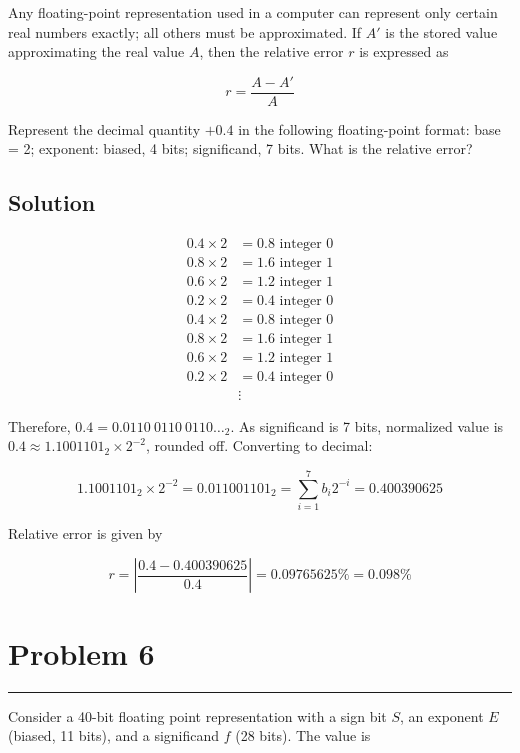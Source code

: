 \documentclass{article}
\begin{document}
Any floating-point representation used in a computer can represent only certain real numbers exactly; all others must be approximated. If $A'$ is the stored value approximating the real value $A$, then the relative error $r$ is expressed as

\[
    r = \frac{A - A'}{A}
\]

Represent the decimal quantity $+0.4$ in the following floating-point format: base = 2; exponent: biased, 4 bits; significand, 7 bits. What is the relative error?

\subsection*{Solution}

\[\begin{aligned}
        0.4 \times 2 & = 0.8 \text{ integer } 0 \\
        0.8 \times 2 & = 1.6 \text{ integer } 1 \\
        0.6 \times 2 & = 1.2 \text{ integer } 1 \\
        0.2 \times 2 & = 0.4 \text{ integer } 0 \\
        0.4 \times 2 & = 0.8 \text{ integer } 0 \\
        0.8 \times 2 & = 1.6 \text{ integer } 1 \\
        0.6 \times 2 & = 1.2 \text{ integer } 1 \\
        0.2 \times 2 & = 0.4 \text{ integer } 0 \\
                     & \vdots
    \end{aligned}\]

Therefore, $0.4 = 0.0110\ 0110\ 0110\dots_2$. As significand is 7 bits, normalized value is $0.4 \approx 1.1001101_2 \times 2^{-2}$, rounded off. Converting to decimal:

\[
    1.1001101_2 \times 2^{-2} = 0.011001101_2 = \sum_{i=1}^{7} b_i2^{-i} = 0.400390625
\]

Relative error is given by

\[
    r = |\frac{0.4 - 0.400390625}{0.4}| = 0.09765625\% = 0.098\%
\]

\section*{Problem 6}
\hrule
\vspace{0.5cm}

Consider a 40-bit floating point representation with a sign bit $S$, an exponent $E$ (biased, 11 bits), and a
significand $f$ (28 bits). The value is
\end{document}
